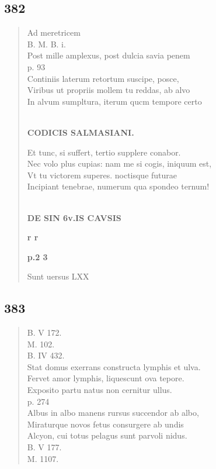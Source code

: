 \documentclass[11pt, a4paper]{report}
\begin{document}
            \subsection*{382}
      \begin{verse}
       \lbrack Ad meretricem \rbrack  \\ B. M. B. i. \\ Post mille amplexus, post dulcia savia penem \\ p. 93 \\ Continiis laterum retortum suscipe, posce, \\ Viribus ut propriis mollem tu reddas, ab alvo \\ In alvum sumpltura, iterum qucm tempore certo \\ 
        ﻿\pagebreak 
    \begin{center} \textbf{CODICIS SALMASIANI.} \end{center} \marginpar{[293]} Et tunc, si suffert, tertio supplere conabor. \\ Nec volo plus cupias: nam me si cogis, iniquum est, \\ Vt tu victorem superes. noctisque futurae \\ Incipiant tenebrae, numerum qua spondeo ternum! \\ 
        ﻿\pagebreak 
    \begin{center} \textbf{DE SIN 6v.IS CAVSIS} \end{center}\begin{center} \textbf{r r} \end{center} \marginpar{[7]}  \marginpar{[I]} \begin{center} \textbf{p.2 3} \end{center}Sunt uersus LXX \\ 
      \end{verse}
  
            \subsection*{383}
      \begin{verse}
      B. V 172. \\ M. 102. \\ B. IV 432. \\ Stat domus exerrans constructa lymphis et ulva. \\ Fervet amor lymphis, liquescunt ova tepore. \\ Exposito partu natus non cernitur ullus. \\ p. 274 \\ Albus in albo manens rursus succendor ab albo, \\ Miraturque novos fetus consurgere ab undis \\ Alcyon, cui totus pelagus sunt parvoli nidus. \\ B. V 177. \\ M. 1107. \\ 
      \end{verse}
  
\end{document}
